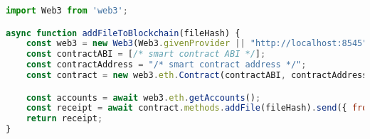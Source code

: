 \documentclass{article}
\begin{document}
\begin{lstlisting}[language=JavaScript, caption=JavaScript code for adding a file to the blockchain]
import Web3 from 'web3';

async function addFileToBlockchain(fileHash) {
    const web3 = new Web3(Web3.givenProvider || "http://localhost:8545");
    const contractABI = [/* smart contract ABI */];
    const contractAddress = "/* smart contract address */";
    const contract = new web3.eth.Contract(contractABI, contractAddress);

    const accounts = await web3.eth.getAccounts();
    const receipt = await contract.methods.addFile(fileHash).send({ from: accounts[0] });
    return receipt;
}
\end{lstlisting}
\end{document}
